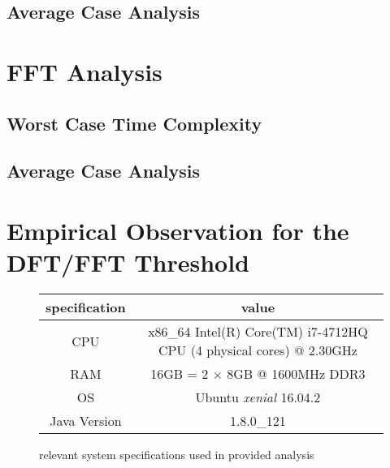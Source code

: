 \documentclass[]{article}
\begin{document}
\subsection{Average Case Analysis}
\section{FFT Analysis}\label{sec:fft}
\subsection{Worst Case Time Complexity}
\subsection{Average Case Analysis}
\section{Empirical Observation for the DFT/FFT Threshold}\label{sec:threshold}
\begin{figure}[h]
	\begin{center}
		\begin{tabular}{ | c | c | }
			\hline
			specification & value \\
			\hline
			CPU & x86\_64 Intel(R) Core(TM) i7-4712HQ CPU (4 physical cores) @ 2.30GHz \\
			\hline
			RAM & 16GB = 2 $\times$ 8GB @ 1600MHz DDR3\\ 
			\hline
			OS & Ubuntu \emph{xenial} 16.04.2 \\
			\hline
			Java Version & 1.8.0\_121 \\
			\hline
		\end{tabular}
	\end{center}
	\caption{relevant system specifications used in provided analysis\label{fig:specs}}
\end{figure}
\end{document}

